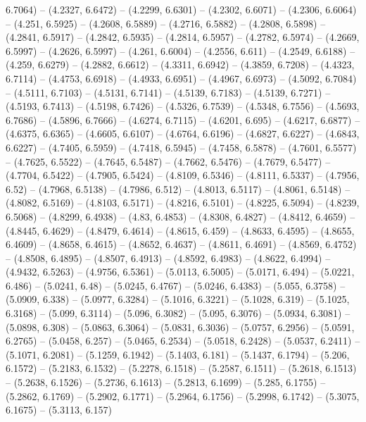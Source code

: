 {  6.7064) -- (4.2327, 6.6472) -- (4.2299, 6.6301) -- (4.2302, 6.6071) -- 
  (4.2306, 6.6064) -- (4.251, 6.5925) -- (4.2608, 6.5889) -- (4.2716, 6.5882) --
   (4.2808, 6.5898) -- (4.2841, 6.5917) -- (4.2842, 6.5935) -- (4.2814, 6.5957) 
  -- (4.2782, 6.5974) -- (4.2669, 6.5997) -- (4.2626, 6.5997) -- (4.261, 6.6004)
   -- (4.2556, 6.611) -- (4.2549, 6.6188) -- (4.259, 6.6279) -- (4.2882, 6.6612)
   -- (4.3311, 6.6942) -- (4.3859, 6.7208) -- (4.4323, 6.7114) -- (4.4753, 
  6.6918) -- (4.4933, 6.6951) -- (4.4967, 6.6973) -- (4.5092, 6.7084) -- 
  (4.5111, 6.7103) -- (4.5131, 6.7141) -- (4.5139, 6.7183) -- (4.5139, 6.7271) 
  -- (4.5193, 6.7413) -- (4.5198, 6.7426) -- (4.5326, 6.7539) -- (4.5348, 
  6.7556) -- (4.5693, 6.7686) -- (4.5896, 6.7666) -- (4.6274, 6.7115) -- 
  (4.6201, 6.695) -- (4.6217, 6.6877) -- (4.6375, 6.6365) -- (4.6605, 6.6107) --
   (4.6764, 6.6196) -- (4.6827, 6.6227) -- (4.6843, 6.6227) -- (4.7405, 6.5959) 
  -- (4.7418, 6.5945) -- (4.7458, 6.5878) -- (4.7601, 6.5577) -- (4.7625, 
  6.5522) -- (4.7645, 6.5487) -- (4.7662, 6.5476) -- (4.7679, 6.5477) -- 
  (4.7704, 6.5422) -- (4.7905, 6.5424) -- (4.8109, 6.5346) -- (4.8111, 6.5337) 
  -- (4.7956, 6.52) -- (4.7968, 6.5138) -- (4.7986, 6.512) -- (4.8013, 6.5117) 
  -- (4.8061, 6.5148) -- (4.8082, 6.5169) -- (4.8103, 6.5171) -- (4.8216, 
  6.5101) -- (4.8225, 6.5094) -- (4.8239, 6.5068) -- (4.8299, 6.4938) -- (4.83, 
  6.4853) -- (4.8308, 6.4827) -- (4.8412, 6.4659) -- (4.8445, 6.4629) -- 
  (4.8479, 6.4614) -- (4.8615, 6.459) -- (4.8633, 6.4595) -- (4.8655, 6.4609) --
   (4.8658, 6.4615) -- (4.8652, 6.4637) -- (4.8611, 6.4691) -- (4.8569, 6.4752) 
  -- (4.8508, 6.4895) -- (4.8507, 6.4913) -- (4.8592, 6.4983) -- (4.8622, 
  6.4994) -- (4.9432, 6.5263) -- (4.9756, 6.5361) -- (5.0113, 6.5005) -- 
  (5.0171, 6.494) -- (5.0221, 6.486) -- (5.0241, 6.48) -- (5.0245, 6.4767) -- 
  (5.0246, 6.4383) -- (5.055, 6.3758) -- (5.0909, 6.338) -- (5.0977, 6.3284) -- 
  (5.1016, 6.3221) -- (5.1028, 6.319) -- (5.1025, 6.3168) -- (5.099, 6.3114) -- 
  (5.096, 6.3082) -- (5.095, 6.3076) -- (5.0934, 6.3081) -- (5.0898, 6.308) -- 
  (5.0863, 6.3064) -- (5.0831, 6.3036) -- (5.0757, 6.2956) -- (5.0591, 6.2765) 
  -- (5.0458, 6.257) -- (5.0465, 6.2534) -- (5.0518, 6.2428) -- (5.0537, 6.2411)
   -- (5.1071, 6.2081) -- (5.1259, 6.1942) -- (5.1403, 6.181) -- (5.1437, 
  6.1794) -- (5.206, 6.1572) -- (5.2183, 6.1532) -- (5.2278, 6.1518) -- (5.2587,
   6.1511) -- (5.2618, 6.1513) -- (5.2638, 6.1526) -- (5.2736, 6.1613) -- 
  (5.2813, 6.1699) -- (5.285, 6.1755) -- (5.2862, 6.1769) -- (5.2902, 6.1771) --
   (5.2964, 6.1756) -- (5.2998, 6.1742) -- (5.3075, 6.1675) -- (5.3113, 6.157) 
}

